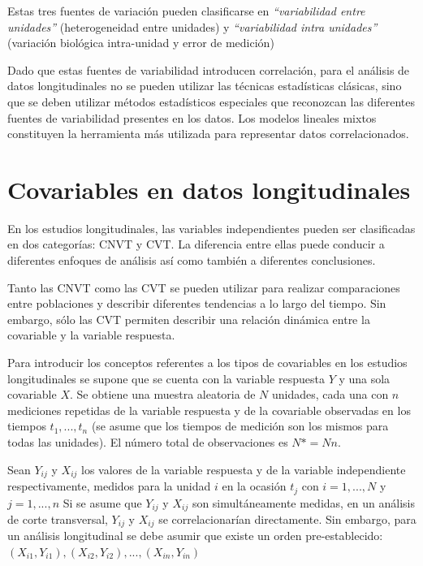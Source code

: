 \documentclass[spanish]{article}
\numberwithin{figure}{subsection}
\numberwithin{equation}{subsection}
\numberwithin{table}{subsection}
\begin{document}
Estas tres fuentes de variación pueden clasificarse en \textit{``variabilidad
entre unidades''} (heterogeneidad entre unidades) y \textit{``variabilidad
intra unidades''} (variación biológica intra-unidad y error de medición)

Dado que estas fuentes de variabilidad introducen correlación, para el análisis
de datos longitudinales no se pueden utilizar las técnicas estadísticas
clásicas, sino que se deben utilizar métodos estadísticos especiales que
reconozcan las diferentes fuentes de variabilidad presentes en los datos. Los
modelos lineales mixtos constituyen la herramienta más utilizada para
representar datos correlacionados.

\section{Covariables en datos longitudinales}

En los estudios longitudinales, las variables independientes pueden ser
clasificadas en dos categorías: CNVT y CVT. La diferencia entre
ellas puede conducir a diferentes enfoques de análisis así como también a
diferentes conclusiones.

Tanto las CNVT como las CVT se pueden utilizar para realizar comparaciones entre
poblaciones y describir diferentes tendencias a lo largo del tiempo. Sin
embargo, sólo las CVT permiten describir una relación dinámica entre la
covariable y la variable respuesta.

Para introducir los conceptos referentes a los tipos de covariables en los
estudios longitudinales se supone que se cuenta con la variable respuesta $Y$ y
una sola covariable $X$. Se obtiene una muestra aleatoria de $N$ unidades, cada
una con $n$ mediciones repetidas de la variable respuesta y de la covariable
observadas en los tiempos $t_1, ..., t_n$ (se asume que los tiempos de medición
son los mismos para todas las unidades). El número total de observaciones es
$N*=Nn$.

Sean $Y_{ij}$ y $X_{ij}$ los valores de la variable respuesta y de la variable
independiente respectivamente, medidos para la unidad $i$ en la ocasión $t_j$
con $i = 1, ..., N$ y $j = 1, ..., n$ Si se asume que $Y_{ij}$ y $X_{ij}$ son
simultáneamente medidas, en un análisis de corte transversal, $Y_{ij}$ y
$X_{ij}$ se correlacionarían directamente. Sin embargo, para un análisis
longitudinal se debe asumir que existe un orden pre-establecido:
$(X_{i1}, Y_{i1}), (X_{i2}, Y_{i2}), ..., (X_{in}, Y_{in})$
\end{document}
